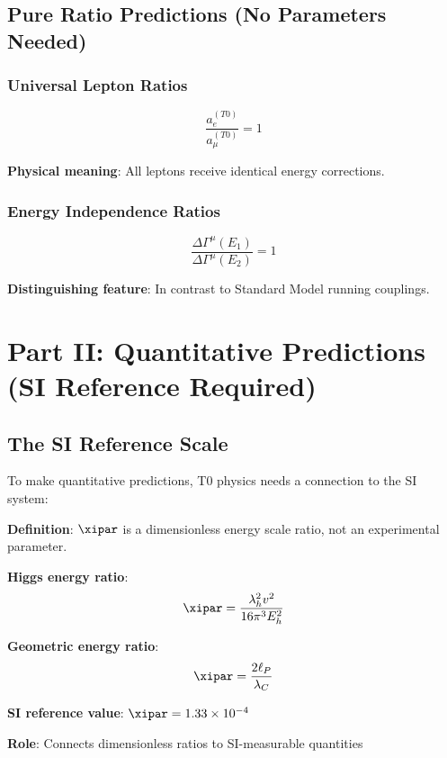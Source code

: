 	\subsection{Pure Ratio Predictions (No Parameters Needed)}
	
	\subsubsection{Universal Lepton Ratios}
	
	\begin{equation}
		\boxed{\frac{a_e^{(T0)}}{a_{\mu}^{(T0)}} = 1}
		\label{eq:universal_lepton_ratio}
	\end{equation}
	
	\textbf{Physical meaning}: All leptons receive identical energy corrections.
	
	\subsubsection{Energy Independence Ratios}
	
	\begin{equation}
		\boxed{\frac{\Delta\Gamma^{\mu}(E_1)}{\Delta\Gamma^{\mu}(E_2)} = 1}
		\label{eq:energy_independence_ratio}
	\end{equation}
	
	\textbf{Distinguishing feature}: In contrast to Standard Model running couplings.
	
	\section{Part II: Quantitative Predictions (SI Reference Required)}
	
	\subsection{The SI Reference Scale}
	
	To make quantitative predictions, T0 physics needs a connection to the SI system:
	
	\begin{tcolorbox}[colback=green!5!white,colframe=green!75!black,title=SI Reference Scale (Not a Parameter!)]
		\textbf{Definition}: $\xipar$ is a dimensionless energy scale ratio, not an experimental parameter.
		
		\textbf{Higgs energy ratio}:
		\begin{equation}
			\xipar = \frac{\lambda_h^2 v^2}{16\pi^3 E_h^2}
		\end{equation}
		
		\textbf{Geometric energy ratio}:
		\begin{equation}
			\xipar = \frac{2\ell_P}{\lambda_C}
		\end{equation}
		
		\textbf{SI reference value}: $\xipar = 1.33 \times 10^{-4}$
		
		\textbf{Role}: Connects dimensionless ratios to SI-measurable quantities
	\end{tcolorbox}
	
